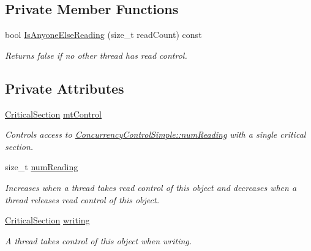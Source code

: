 \subsection*{Private Member Functions}
\begin{DoxyCompactItemize}
\item 
bool \hyperlink{class_concurrency_control_simple_a9e5e31fbda9c7403aa11780036cd7bf8}{IsAnyoneElseReading} (size\_\-t readCount) const 
\begin{DoxyCompactList}\small\item\em Returns false if no other thread has read control. \item\end{DoxyCompactList}\end{DoxyCompactItemize}
\subsection*{Private Attributes}
\begin{DoxyCompactItemize}
\item 
\hypertarget{class_concurrency_control_simple_a97ede0b473f8673319f81d6760a4bd2c}{
\hyperlink{class_critical_section}{CriticalSection} \hyperlink{class_concurrency_control_simple_a97ede0b473f8673319f81d6760a4bd2c}{mtControl}}
\label{class_concurrency_control_simple_a97ede0b473f8673319f81d6760a4bd2c}

\begin{DoxyCompactList}\small\item\em Controls access to \hyperlink{class_concurrency_control_simple_ab197742bd53accc09efc385464dfb0c3}{ConcurrencyControlSimple::numReading} with a single critical section. \item\end{DoxyCompactList}\item 
\hypertarget{class_concurrency_control_simple_ab197742bd53accc09efc385464dfb0c3}{
size\_\-t \hyperlink{class_concurrency_control_simple_ab197742bd53accc09efc385464dfb0c3}{numReading}}
\label{class_concurrency_control_simple_ab197742bd53accc09efc385464dfb0c3}

\begin{DoxyCompactList}\small\item\em Increases when a thread takes read control of this object and decreases when a thread releases read control of this object. \item\end{DoxyCompactList}\item 
\hypertarget{class_concurrency_control_simple_acb42ee4c44d6f3d6b8310f792c7eca45}{
\hyperlink{class_critical_section}{CriticalSection} \hyperlink{class_concurrency_control_simple_acb42ee4c44d6f3d6b8310f792c7eca45}{writing}}
\label{class_concurrency_control_simple_acb42ee4c44d6f3d6b8310f792c7eca45}

\begin{DoxyCompactList}\small\item\em A thread takes control of this object when writing. \item\end{DoxyCompactList}\end{DoxyCompactItemize}


